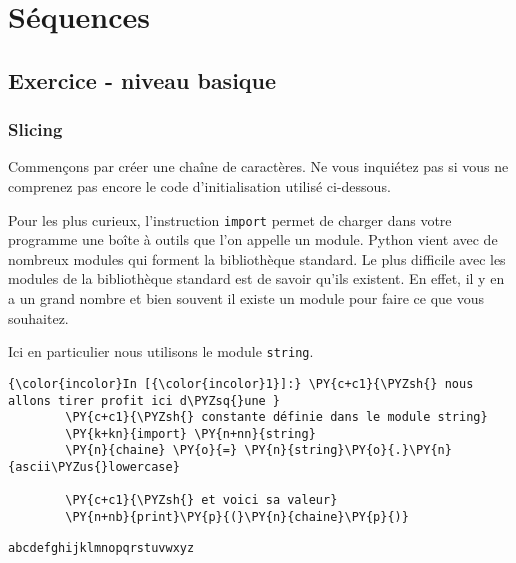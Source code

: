     
    
    
    

    

    \hypertarget{suxe9quences}{%
\section{Séquences}\label{suxe9quences}}

    \hypertarget{exercice---niveau-basique}{%
\subsection{Exercice - niveau basique}\label{exercice---niveau-basique}}

    \hypertarget{slicing}{%
\subsubsection{Slicing}\label{slicing}}

    Commençons par créer une chaîne de caractères. Ne vous inquiétez pas si
vous ne comprenez pas encore le code d'initialisation utilisé
ci-dessous.

Pour les plus curieux, l'instruction \texttt{import} permet de charger
dans votre programme une boîte à outils que l'on appelle un module.
Python vient avec de nombreux modules qui forment la bibliothèque
standard. Le plus difficile avec les modules de la bibliothèque standard
est de savoir qu'ils existent. En effet, il y en a un grand nombre et
bien souvent il existe un module pour faire ce que vous souhaitez.

Ici en particulier nous utilisons le module \texttt{string}.

    \begin{Verbatim}[commandchars=\\\{\}]
{\color{incolor}In [{\color{incolor}1}]:} \PY{c+c1}{\PYZsh{} nous allons tirer profit ici d\PYZsq{}une }
        \PY{c+c1}{\PYZsh{} constante définie dans le module string}
        \PY{k+kn}{import} \PY{n+nn}{string}
        \PY{n}{chaine} \PY{o}{=} \PY{n}{string}\PY{o}{.}\PY{n}{ascii\PYZus{}lowercase}
        
        \PY{c+c1}{\PYZsh{} et voici sa valeur}
        \PY{n+nb}{print}\PY{p}{(}\PY{n}{chaine}\PY{p}{)}
\end{Verbatim}


    \begin{Verbatim}[commandchars=\\\{\}]
abcdefghijklmnopqrstuvwxyz

    \end{Verbatim}

